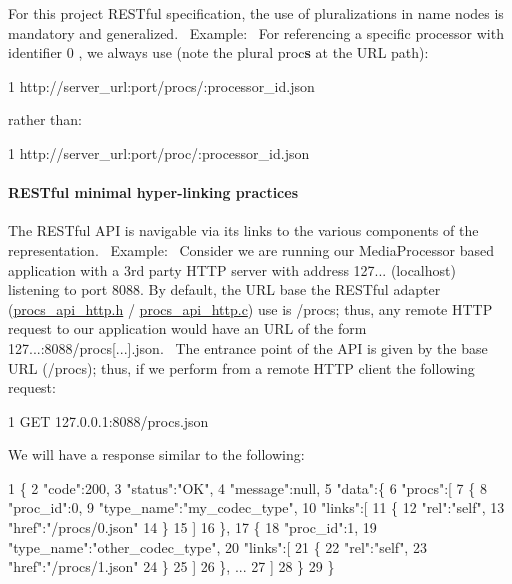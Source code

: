 For this project R\+E\+S\+Tful specification, the use of pluralizations in name nodes is mandatory and generalized.~\newline
 Example\+:~\newline
 For referencing a specific processor with identifier \textquotesingle{}0\textquotesingle{} , we always use (note the plural \textquotesingle{}proc{\bfseries s}\textquotesingle{} at the U\+RL path)\+: 
\begin{DoxyCode}
1 http://server\_url:port/procs/:processor\_id.json
\end{DoxyCode}
 rather than\+:~\newline
 
\begin{DoxyCode}
1 http://server\_url:port/proc/:processor\_id.json
\end{DoxyCode}


\paragraph*{R\+E\+S\+Tful minimal hyper-\/linking practices}

The R\+E\+S\+Tful A\+PI is navigable via its links to the various components of the representation.~\newline
 Example\+:~\newline
 Consider we are running our Media\+Processor based application with a 3rd party H\+T\+TP server with address 127... (\textquotesingle{}localhost\textquotesingle{}) listening to port 8088. By default, the U\+RL base the R\+E\+S\+Tful adapter (\hyperlink{procs__api__http_8h}{procs\+\_\+api\+\_\+http.\+h} / \hyperlink{procs__api__http_8c}{procs\+\_\+api\+\_\+http.\+c}) use is \textquotesingle{}/procs\textquotesingle{}; thus, any remote H\+T\+TP request to our application would have an U\+RL of the form \textquotesingle{}127...\+:8088/procs\mbox{[}...\mbox{]}.json\textquotesingle{}.~\newline
 The \textquotesingle{}entrance point\textquotesingle{} of the A\+PI is given by the base U\+RL (\textquotesingle{}/procs\textquotesingle{}); thus, if we perform from a remote H\+T\+TP client the following request\+:~\newline
 
\begin{DoxyCode}
1 GET 127.0.0.1:8088/procs.json
\end{DoxyCode}
 We will have a response similar to the following\+: 
\begin{DoxyCode}
1 \{
2    "code":200,
3    "status":"OK",
4    "message":null,
5    "data":\{
6       "procs":[
7          \{
8             "proc\_id":0,
9             "type\_name":"my\_codec\_type",
10             "links":[
11                \{
12                   "rel":"self",
13                   "href":"/procs/0.json"
14                \}
15             ]
16          \},
17          \{
18             "proc\_id":1,
19             "type\_name":"other\_codec\_type",
20             "links":[
21                \{
22                   "rel":"self",
23                   "href":"/procs/1.json"
24                \}
25             ]
26          \}, ...
27       ]
28    \}
29 \}
\end{DoxyCode}


